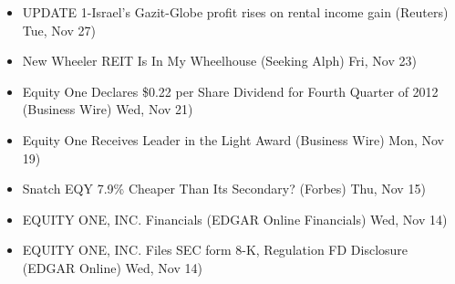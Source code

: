 \documentclass[11pt,asymmetric]{article}
\begin{document}
\begin{itemize}
\item UPDATE 1-Israel's Gazit-Globe profit rises on rental income gain (Reuters) Tue, Nov 27)
\item New Wheeler REIT Is In My Wheelhouse (Seeking Alph) Fri, Nov 23)
\item Equity One Declares \$0.22 per Share Dividend for Fourth Quarter of 2012 (Business Wire) Wed, Nov 21)
\item Equity One Receives Leader in the Light Award (Business Wire) Mon, Nov 19)
\item Snatch EQY 7.9\% Cheaper Than Its Secondary? (Forbes) Thu, Nov 15)
\item EQUITY ONE, INC. Financials (EDGAR Online Financials) Wed, Nov 14)
\item EQUITY ONE, INC. Files SEC form 8-K, Regulation FD Disclosure (EDGAR Online) Wed, Nov 14)
\end{itemize}
\end{document}
